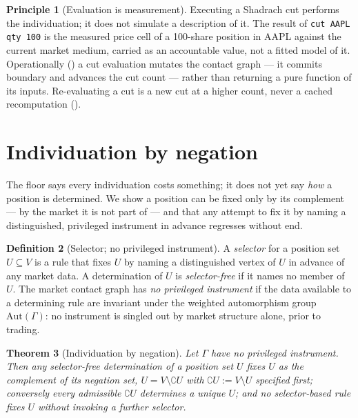 \documentclass[11pt,a4paper]{article}
\theoremstyle{thmstyle}
\newtheorem{theorem}{Theorem}[section]
\theoremstyle{definition}
\newtheorem{definition}[theorem]{Definition}
\newtheorem{principle}[theorem]{Principle}
\theoremstyle{remark}
\newcommand{\Gph}{\Gamma}
\newcommand{\V}{V}
\newcommand{\co}{\complement}
\newcommand{\sh}[1]{\texttt{#1}}
\begin{document}
\begin{principle}[Evaluation is measurement]
\label{prin:measure}
Executing a Shadrach cut performs the individuation; it does not
simulate a description of it. The result of \sh{cut AAPL qty 100} is
the measured price cell of a 100-share position in AAPL against the
current market medium, carried as an accountable value, not a fitted
model of it. Operationally () a cut evaluation mutates
the contact graph --- it commits boundary and advances the cut count ---
rather than returning a pure function of its inputs. Re-evaluating a
cut is a new cut at a higher count, never a cached recomputation
().
\end{principle}

\section{Individuation by negation}
\label{sec:negation}

The floor says every individuation costs something; it does not yet say
\emph{how} a position is determined. We show a position can be fixed
only by its complement --- by the market it is not part of --- and that
any attempt to fix it by naming a distinguished, privileged instrument
in advance regresses without end.

\begin{definition}[Selector; no privileged instrument]
\label{def:selector}
A \emph{selector} for a position set $U\subseteq\V$ is a rule that fixes
$U$ by naming a distinguished vertex of $U$ in advance of any market
data. A determination of $U$ is \emph{selector-free} if it names no
member of $U$. The market contact graph has \emph{no privileged
instrument} if the data available to a determining rule are invariant
under the weighted automorphism group $\mathrm{Aut}(\Gph)$: no
instrument is singled out by market structure alone, prior to trading.
\end{definition}

\begin{theorem}[Individuation by negation]
\label{thm:negation}
Let $\Gph$ have no privileged instrument. Then any selector-free
determination of a position set $U$ fixes $U$ as the complement of its
negation set, $U=\V\setminus\co U$ with $\co U:=\V\setminus U$ specified
first; conversely every admissible $\co U$ determines a unique $U$; and
no selector-based rule fixes $U$ without invoking a further selector.
\end{theorem}
\end{document}
